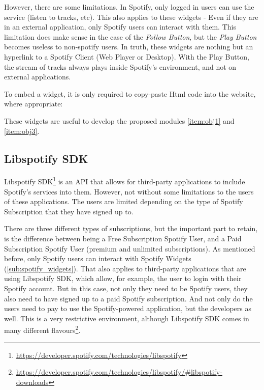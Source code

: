       However, there are some limitations.
      In Spotify, only logged in users can use the service (listen to tracks, etc).
      This also applies to these widgets - Even if they are in an external application, only Spotify users can interact with them.
      This limitation does make sense in the case of the \emph{Follow Button}, but the \emph{Play Button} becomes useless to non-spotify users.
      In truth, these widgets are nothing but an hyperlink to a Spotify Client (Web Player or Desktop).
      With the Play Button, the stream of tracks always plays inside Spotify's environment, and not on external applications.

      To embed a widget, it is only required to copy-paste Html code into the website, where appropriate:

      

      These widgets are useful to develop the proposed modules \ref{item:obj1} and \ref{item:obj3}.


    \subsection{Libspotify SDK} %
    \label{sub:libspotify_sdk}

      Libspotify SDK\footnote{\url{https://developer.spotify.com/technologies/libspotify}} is an API that allows for third-party applications to include Spotify's services into them.
      However, not without some limitations to the users of these applications.
      The users are limited depending on the type of Spotify Subscription that they have signed up to.

      There are three different types of subscriptions, but the important part to retain, is the difference between being a Free Subscription Spotify User, and a Paid Subscription Spotify User (premium and unlimited subscriptions).
      As mentioned before, only Spotify users can interact with Spotify Widgets (\ref{sub:spotify_widgets}).
      That also applies to third-party applications that are using Libspotify SDK, which allow, for example, the user to login with their Spotify account.
      But in this case, not only they need to be Spotify users, they also need to have signed up to a paid Spotify subscription.
      And not only do the users need to pay to use the Spotify-powered application, but the developers as well.
      This is a very restrictive environment, although Libspotify SDK comes in many different flavours\footnote{\url{https://developer.spotify.com/technologies/libspotify/\#libspotify-downloads}}.

